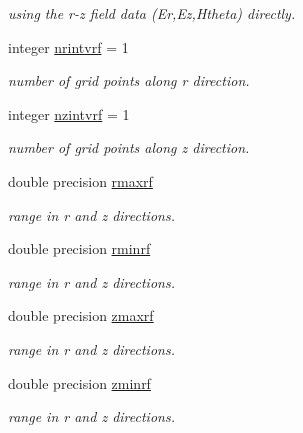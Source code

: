 \textbf{ }\par
{\em using the r-\/z field data (Er,Ez,Htheta) directly. }\begin{DoxyCompactItemize}
\item 
integer \mbox{\hyperlink{namespacedataclass_a3b9a2feb5ab8139d532626cad00a9769}{nrintvrf}} = 1
\begin{DoxyCompactList}\small\item\em number of grid points along r direction. \end{DoxyCompactList}\item 
integer \mbox{\hyperlink{namespacedataclass_a7dee8b652907c73253c32891a2a08514}{nzintvrf}} = 1
\begin{DoxyCompactList}\small\item\em number of grid points along z direction. \end{DoxyCompactList}\end{DoxyCompactItemize}

\textbf{ }\par
\begin{DoxyCompactItemize}
\item 
double precision \mbox{\hyperlink{namespacedataclass_a8ea08da279b20aa500095cba377a2de2}{rmaxrf}}
\begin{DoxyCompactList}\small\item\em range in r and z directions. \end{DoxyCompactList}\item 
double precision \mbox{\hyperlink{namespacedataclass_aae1944e971e5c71db5d8f21afceb0935}{rminrf}}
\begin{DoxyCompactList}\small\item\em range in r and z directions. \end{DoxyCompactList}\item 
double precision \mbox{\hyperlink{namespacedataclass_a4646788256b1b461413c546d6df8ee88}{zmaxrf}}
\begin{DoxyCompactList}\small\item\em range in r and z directions. \end{DoxyCompactList}\item 
double precision \mbox{\hyperlink{namespacedataclass_a24985c63a3d2c04ccb2cf299eff0c626}{zminrf}}
\begin{DoxyCompactList}\small\item\em range in r and z directions. \end{DoxyCompactList}\end{DoxyCompactItemize}

